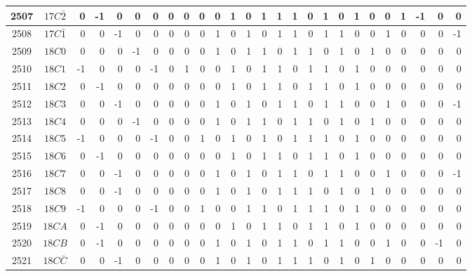 \documentclass[12 pt]{article}%
\begin{document}
\begin{tiny}
\begin{centering}
\begin{longtable}{|c|c||rrrrrrrrrrrrrrrrrrrrrrrr|}
      \hline
      2507 & $17C\bar2$ & 0 & -1 & 0 & 0 & 0 & 0 & 0 & 0 & 0 & 1 & 0 & 1 & 1 & 1 & 0 & 1 & 0 & 1 & 0 & 0 & 1 & -1 & 0 & 0 \\
      \hline
      2508 & $17C\bar1$ & 0 & 0 & -1 & 0 & 0 & 0 & 0 & 0 & 1 & 0 & 1 & 0 & 1 & 1 & 0 & 1 & 1 & 0 & 0 & 1 & 0 & 0 & 0 & -1 \\
      \hline
      2509 & $18C0$ & 0 & 0 & 0 & -1 & 0 & 0 & 0 & 0 & 1 & 0 & 1 & 1 & 0 & 1 & 1 & 0 & 1 & 0 & 1 & 0 & 0 & 0 & 0 & 0 \\
      \hline
      2510 & $18C1$ & -1 & 0 & 0 & 0 & -1 & 0 & 1 & 0 & 0 & 1 & 0 & 1 & 1 & 0 & 1 & 1 & 0 & 1 & 0 & 0 & 0 & 0 & 0 & 0 \\
      \hline
      2511 & $18C2$ & 0 & -1 & 0 & 0 & 0 & 0 & 0 & 0 & 0 & 1 & 0 & 1 & 1 & 0 & 1 & 1 & 0 & 1 & 0 & 0 & 0 & 0 & 0 & 0 \\
      \hline
      2512 & $18C3$ & 0 & 0 & -1 & 0 & 0 & 0 & 0 & 0 & 1 & 0 & 1 & 0 & 1 & 1 & 0 & 1 & 1 & 0 & 0 & 1 & 0 & 0 & 0 & -1 \\
      \hline
      2513 & $18C4$ & 0 & 0 & 0 & -1 & 0 & 0 & 0 & 0 & 1 & 0 & 1 & 1 & 0 & 1 & 1 & 0 & 1 & 0 & 1 & 0 & 0 & 0 & 0 & 0 \\
      \hline
      2514 & $18C5$ & -1 & 0 & 0 & 0 & -1 & 0 & 0 & 1 & 0 & 1 & 0 & 1 & 0 & 1 & 1 & 1 & 0 & 1 & 0 & 0 & 0 & 0 & 0 & 0 \\
      \hline
      2515 & $18C6$ & 0 & -1 & 0 & 0 & 0 & 0 & 0 & 0 & 0 & 1 & 0 & 1 & 1 & 0 & 1 & 1 & 0 & 1 & 0 & 0 & 0 & 0 & 0 & 0 \\
      \hline
      2516 & $18C7$ & 0 & 0 & -1 & 0 & 0 & 0 & 0 & 0 & 1 & 0 & 1 & 0 & 1 & 1 & 0 & 1 & 1 & 0 & 0 & 1 & 0 & 0 & 0 & -1 \\
      \hline
      2517 & $18C8$ & 0 & 0 & -1 & 0 & 0 & 0 & 0 & 0 & 1 & 0 & 1 & 0 & 1 & 1 & 1 & 0 & 1 & 0 & 1 & 0 & 0 & 0 & 0 & 0 \\
      \hline
      2518 & $18C9$ & -1 & 0 & 0 & 0 & -1 & 0 & 0 & 1 & 0 & 0 & 1 & 1 & 0 & 1 & 1 & 1 & 0 & 1 & 0 & 0 & 0 & 0 & 0 & 0 \\
      \hline
      2519 & $18CA$ & 0 & -1 & 0 & 0 & 0 & 0 & 0 & 0 & 0 & 1 & 0 & 1 & 1 & 0 & 1 & 1 & 0 & 1 & 0 & 0 & 0 & 0 & 0 & 0 \\
      \hline
      2520 & $18CB$ & 0 & -1 & 0 & 0 & 0 & 0 & 0 & 0 & 1 & 0 & 1 & 0 & 1 & 1 & 0 & 1 & 1 & 0 & 0 & 1 & 0 & 0 & -1 & 0 \\
      \hline
      2521 & $18C\bar C$ & 0 & 0 & -1 & 0 & 0 & 0 & 0 & 0 & 1 & 0 & 1 & 0 & 1 & 1 & 1 & 0 & 1 & 0 & 1 & 0 & 0 & 0 & 0 & 0 \\

\end{longtable}
\end{centering}
\end{tiny}
\end{document}
